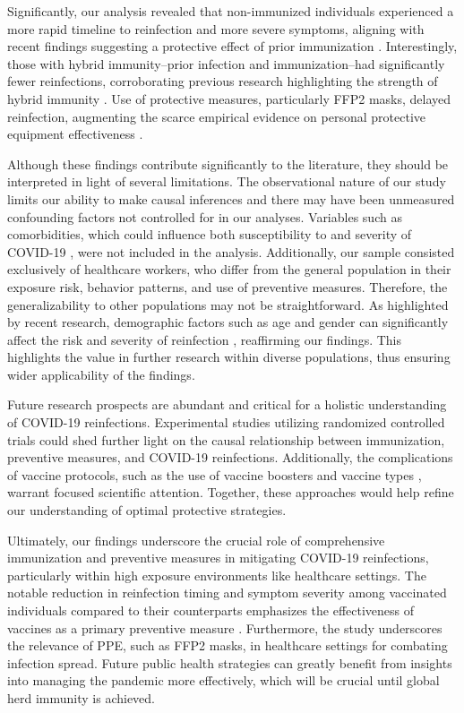 \documentclass[11pt]{article}
\begin{document}
Significantly, our analysis revealed that non-immunized individuals experienced a more rapid timeline to reinfection and more severe symptoms, aligning with recent findings suggesting a protective effect of prior immunization \cite{Bowe2022AcuteAP}. Interestingly, those with hybrid immunity–prior infection and immunization–had significantly fewer reinfections, corroborating previous research highlighting the strength of hybrid immunity \cite{Dan2021ImmunologicalMT}. Use of protective measures, particularly FFP2 masks, delayed reinfection, augmenting the scarce empirical evidence on personal protective equipment effectiveness \cite{kik2021SociodemographicAC}. 

Although these findings contribute significantly to the literature, they should be interpreted in light of several limitations. The observational nature of our study limits our ability to make causal inferences and there may have been unmeasured confounding factors not controlled for in our analyses. Variables such as comorbidities, which could influence both susceptibility to and severity of COVID-19 \cite{Santos2021RecurrentCI}, were not included in the analysis. Additionally, our sample consisted exclusively of healthcare workers, who differ from the general population in their exposure risk, behavior patterns, and use of preventive measures. Therefore, the generalizability to other populations may not be straightforward. As highlighted by recent research, demographic factors such as age and gender can significantly affect the risk and severity of reinfection \cite{Loomba2021MeasuringTI, Santos2021RecurrentCI, Tavakoli2023COVID19RR}, reaffirming our findings. This highlights the value in further research within diverse populations, thus ensuring wider applicability of the findings.

Future research prospects are abundant and critical for a holistic understanding of COVID-19 reinfections. Experimental studies utilizing randomized controlled trials could shed further light on the causal relationship between immunization, preventive measures, and COVID-19 reinfections. Additionally, the complications of vaccine protocols, such as the use of vaccine boosters and vaccine types \cite{Aslaner2022COVID19RA}, warrant focused scientific attention. Together, these approaches would help refine our understanding of optimal protective strategies.

Ultimately, our findings underscore the crucial role of comprehensive immunization and preventive measures in mitigating COVID-19 reinfections, particularly within high exposure environments like healthcare settings. The notable reduction in reinfection timing and symptom severity among vaccinated individuals compared to their counterparts emphasizes the effectiveness of vaccines as a primary preventive measure \cite{Ren2022ReinfectionIP}. Furthermore, the study underscores the relevance of PPE, such as FFP2 masks, in healthcare settings for combating infection spread. Future public health strategies can greatly benefit from insights into managing the pandemic more effectively, which will be crucial until global herd immunity is achieved.
\end{document}
